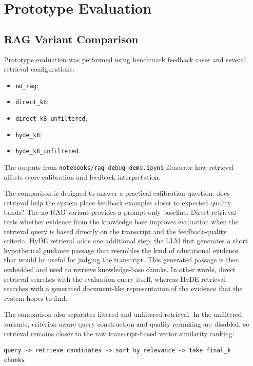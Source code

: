 \section{Prototype Evaluation}

\subsection{RAG Variant Comparison}
Prototype evaluation was performed using benchmark feedback cases and several
retrieval configurations:
\begin{itemize}
    \item \texttt{no\_rag};
    \item \texttt{direct\_k8};
    \item \texttt{direct\_k8\_unfiltered};
    \item \texttt{hyde\_k8};
    \item \texttt{hyde\_k8\_unfiltered}.
\end{itemize}

The outputs from \texttt{notebooks/rag\_debug\_demo.ipynb} illustrate how
retrieval affects score calibration and feedback interpretation.

The comparison is designed to answer a practical calibration question: does
retrieval help the system place feedback examples closer to expected quality
bands? The no-RAG variant provides a prompt-only baseline. Direct retrieval
tests whether evidence from the knowledge base improves evaluation when the
retrieval query is based directly on the transcript and the feedback-quality
criteria. HyDE retrieval adds one additional step: the LLM first generates a
short hypothetical guidance passage that resembles the kind of educational
evidence that would be useful for judging the transcript. This generated passage
is then embedded and used to retrieve knowledge-base chunks. In other words,
direct retrieval searches with the evaluation query itself, whereas HyDE
retrieval searches with a generated document-like representation of the
evidence that the system hopes to find.

The comparison also separates filtered and unfiltered retrieval. In the
unfiltered variants, criterion-aware query construction and quality reranking
are disabled, so retrieval remains closer to the raw transcript-based vector
similarity ranking:

\begin{center}
\texttt{query -> retrieve candidates -> sort by relevance -> take final\_k chunks}
\end{center}

